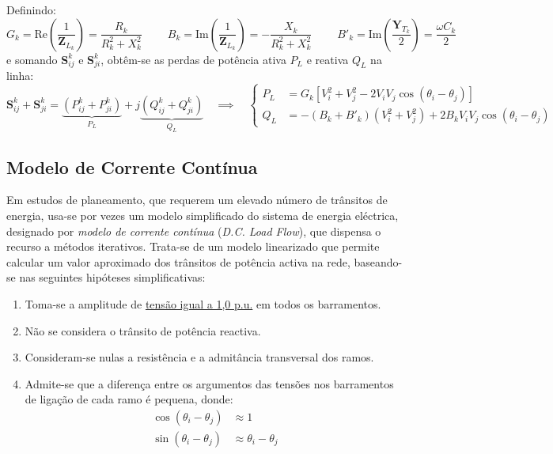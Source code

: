 \vspace{0.5em}
\noindent Definindo:
$$
    G_k = \text{Re} \left( \frac{1}{\mathbf{Z}_{L_k}} \right) = \frac{R_k}{R^2_k + X^2_k} 
    \qquad\;
    B_k = \text{Im} \left( \frac{1}{\mathbf{Z}_{L_k}} \right) = -\frac{X_k}{R^2_k + X^2_k} 
    \qquad\;
    B'_k = \text{Im} \left( \frac{\mathbf{Y}_{T_k}}{2} \right) = \frac{\omega C_k}{2}
$$
e somando $\mathbf{S}^k_{ij}$ e $\mathbf{S}^k_{ji}$, obtêm-se as perdas de potência ativa $P_L$ e reativa $Q_L$ na linha:
$$
    \mathbf{S}^k_{ij} + \mathbf{S}^k_{ji} = \underbrace{(P^k_{ij} + P^k_{ji})}_{P_L} + j\underbrace{(Q^k_{ij} + Q^k_{ji})}_{Q_L}
    \quad\implies\quad
    \left\{\begin{aligned}
        P_L &= G_k [V^2_i + V^2_j - 2 V_i V_j \cos (\theta_i - \theta_j)] \\
        Q_L &= -(B_k + B'_k) (V^2_i + V^2_j) + 2 B_k V_i V_j \cos (\theta_i - \theta_j)
    \end{aligned}\right.  
$$

\subsection{Modelo de Corrente Contínua}

Em estudos de planeamento, que requerem um elevado número de trânsitos de energia, usa-se por vezes um modelo simplificado do sistema de energia eléctrica, designado por \textit{modelo de corrente contínua} (\textit{D.C. Load Flow}), que dispensa o recurso a métodos iterativos. Trata-se de um modelo linearizado que permite calcular um valor aproximado dos trânsitos de potência activa na rede, baseando-se nas seguintes hipóteses simplificativas:

\begin{enumerate}
    \item Toma-se a amplitude de \underline{tensão igual a 1,0 p.u.} em todos os barramentos.
    \item Não se considera o trânsito de potência reactiva.
    \item Consideram-se nulas a resistência e a admitância transversal dos ramos.
    \item Admite-se que a diferença entre os argumentos das tensões nos barramentos de ligação de cada ramo é pequena, donde:
    $$
        \begin{aligned}
            \cos(\theta_i - \theta_j) &\approx 1 \\
            \sin(\theta_i - \theta_j) &\approx \theta_i - \theta_j
        \end{aligned}
    $$
\end{enumerate}

